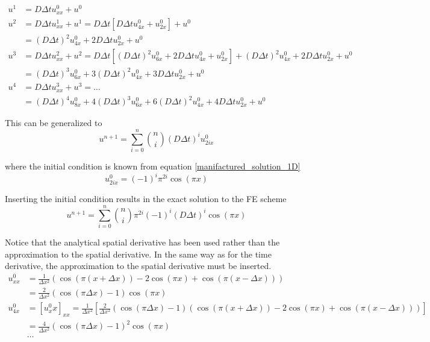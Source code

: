\begin{align*}
 u^1 &= D\Delta t u_{xx}^0 + u^0 \\
 u^2 &= D\Delta t u_{xx}^1 + u^1 = D\Delta t\left[D\Delta t u_{4x}^0 + u_{2x}^0\right] + u^0\\
 &= \left(D\Delta t\right)^2 u_{4x}^0 + 2D\Delta t u_{2x}^0+ u^0 \\
 u^3 &= D\Delta t u_{xx}^2 + u^2 = D\Delta t\left[\left(D\Delta t\right)^2 u_{6x}^0 + 2D\Delta t u_{4x}^0+ u_{2x}^0\right] + \left(D\Delta t\right)^2 u_{4x}^0 + 2D\Delta t u_{2x}^0+ u^0\\
 &= \left(D\Delta t\right)^3 u_{6x}^0 + 3\left(D\Delta t\right)^2 u_{4x}^0+ 3D\Delta tu_{2x}^0 + u^0 \\
 u^4 &= D\Delta t u_{xx}^3 + u^3 = \dots \\
 &= \left(D\Delta t\right)^4 u_{8x}^0 + 4\left(D\Delta t\right)^3 u_{6x}^0+ 6\left(D\Delta t\right)^2 u_{4x}^0 + 4D\Delta t u_{2x}^0 + u^0 
\end{align*}

This can be generalized to 
\begin{equation}
 u^{n+1} = \sum\limits_{i=0}^n {n\choose i}\left(D\Delta t\right)^iu^0_{2ix}
\end{equation}

where the initial condition is known from equation \eqref{manifactured_solution_1D}
\begin{equation*}
 u^0_{2ix} = \left(-1\right)^i\pi^{2i}\cos(\pi x)
\end{equation*}

Inserting the initial condition results in the exact solution to the FE scheme
\begin{equation}
 u^{n+1} = \sum\limits_{i=0}^n {n\choose i}\pi^{2i}\left(-1\right)^i\left(D\Delta t\right)^i\cos(\pi x)
\end{equation}

Notice that the analytical spatial derivative has been used rather than the approximation to the spatial derivative. 
In the same way as for the time derivative, the approximation to the spatial derivative must be inserted. 
\begin{align*}
 u^0_{xx} &= \frac{1}{\Delta x^2}\left(\cos(\pi(x+\Delta x)) -2\cos(\pi x) +\cos(\pi(x-\Delta x))\right) \\
 &= \frac{2}{\Delta x^2}\left(\cos(\pi\Delta x)-1\right)\cos(\pi x)\\
 u^0_{4x} &= [u^0_xx]_{xx} = \frac{1}{\Delta x^2}\left[\frac{2}{\Delta x^2}\left(\cos(\pi\Delta x)-1\right)\left(\cos(\pi(x+\Delta x)) -2\cos(\pi x) +\cos(\pi(x-\Delta x))\right)\right]\\
 &= \frac{4}{\Delta x^2}\left(\cos(\pi\Delta x)-1\right)^2\cos(\pi x)\\
 &\dots
\end{align*}

